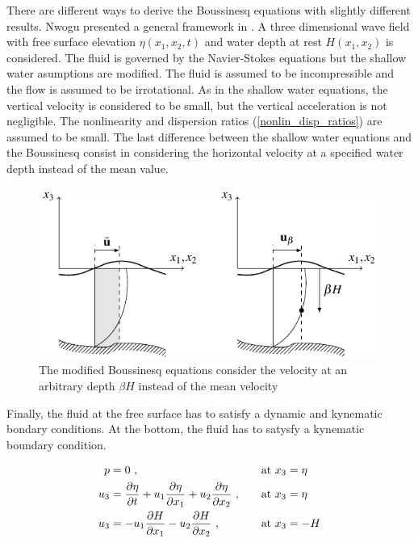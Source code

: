 There are different ways to derive the Boussinesq equations with slightly different results. Nwogu presented a general framework in \cite{nwogu1993}. A three dimensional wave field with free surface elevation $\eta(x_1, x_2, t)$ and water depth at rest $H(x_1, x_2)$ is considered. The fluid is governed by the Navier-Stokes equations but the shallow water asumptions are modified. The fluid is assumed to be incompressible and the flow is assumed to be irrotational. As in the shallow water equations, the vertical velocity is considered to be small, but the vertical acceleration is not negligible. The nonlinearity and dispersion ratios (\ref{nonlin_disp_ratios}) are assumed to be small. The last difference between the shallow water equations and the Boussinesq consist in considering the horizontal velocity at a specified water depth instead of the mean value.

\begin{figure}
    \centering
    \includegraphics[width=.9\textwidth]{img/eq/velocity_beta.pdf}
    \caption{The modified Boussinesq equations consider the velocity at an arbitrary depth $\beta H$ instead of the mean velocity}
\end{figure}

Finally, the fluid at the free surface has to satisfy a dynamic and kynematic bondary conditions. At the bottom, the fluid has to satysfy a kynematic boundary condition.

\begin{equation}\label{dyn_kyn_bc}
\begin{aligned}
p &= 0 \ , \quad &&\text{at } x_3=\eta \\
u_3 &= \frac{\partial\eta}{\partial t} + u_1 \frac{\partial\eta}{\partial x_1}  + u_2 \frac{\partial\eta}{\partial x_2} \ , \quad &&\text{at } x_3=\eta \\
u_3 &= -u_1 \frac{\partial H}{\partial x_1} -u_2 \frac{\partial H}{\partial x_2} \ , \quad &&\text{at } x_3=-H
\end{aligned}
\end{equation}


